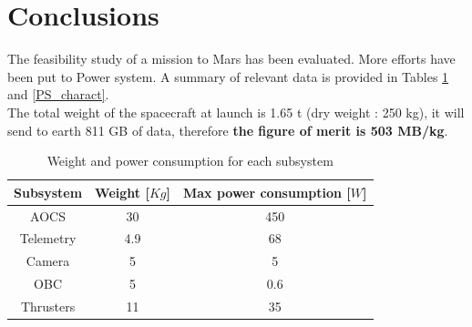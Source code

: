 \documentclass[a4paper, oneside, 11pt]{article}
\begin{document}
\clearpage

\section{Conclusions}

The feasibility study of a mission to Mars has been evaluated. More efforts have been put to Power system. A summary of relevant data is provided in Tables \ref{tab:tab1} and \ref{PS_charact}. \\
The total weight of the spacecraft at launch is 1.65 t (dry weight : 250 kg), it will send to earth 811 GB of data, therefore \textbf{the figure of merit is 503 MB/kg}.\\

\begin{table}[h]
\centering
\label{tab:tab1}
\caption{Weight and power consumption for each subsystem}
\begin{tabular}{| c | c | c |}
\hline
\textbf{Subsystem} & \textbf{Weight} [$Kg$] & \textbf{Max power consumption} [$W$] \\ \hline
AOCS & 30 & 450 \\ 
Telemetry & 4.9 & 68 \\ 
Camera & 5 & 5 \\ 
OBC & 5 & 0.6 \\ 
Thrusters & 11 & 35 \\ \hline

\end{tabular}
\label{tab:tab1}
\end{table}
\end{document}
